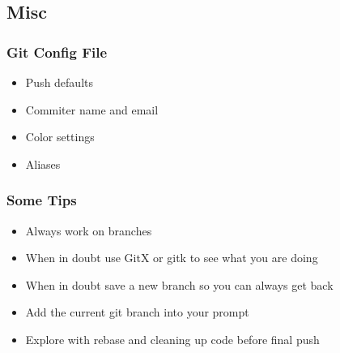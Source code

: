 \subsection{Misc}

\begin{frame}
  \frametitle{Git Config File}
  \begin{itemize}
    \item Push defaults
    \item Commiter name and email
    \item Color settings
    \item Aliases
  \end{itemize}
\end{frame}

\begin{frame}
  \frametitle{Some Tips}
  \begin{itemize}
    \item Always work on branches
      \pause
    \item When in doubt use GitX or gitk to see what you are doing
      \pause
    \item When in doubt save a new branch so you can always get back
      \pause
    \item Add the current git branch into your prompt
      \pause
    \item Explore with rebase and cleaning up code before final push
  \end{itemize}
\end{frame}


